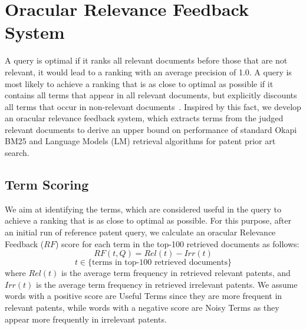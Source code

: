 \section{Oracular Relevance Feedback System}
\label{sec:oraculrquery}
A query is optimal if it ranks all relevant documents before
those that are not relevant, it would lead to a ranking with an average precision of 1.0. A query
is most likely to achieve a ranking that is as close to optimal as possible if it contains all terms that
appear in all relevant documents, but explicitly discounts all terms that occur in non-relevant documents~\citep{manning2008introduction}.
Inspired by this fact, we develop an oracular relevance feedback system, which
extracts terms from the judged relevant documents to derive an upper bound on performance of
standard Okapi BM25 and Language Models (LM) retrieval
algorithms for patent prior art search.
\subsection{Term Scoring}
\label{OracularTermSelection}
We aim at identifying the terms, which are considered useful in the query to achieve a ranking that is as close to optimal as possible. For this purpose, 
after an initial run of reference patent query, we
calculate an oracular Relevance Feedback ($\mathit{RF}$) score for each term in the top-100
retrieved documents as follows:
\begin{equation}
RF(t,Q)=Rel(t)-Irr(t) 
 \label{eq:score}
\end{equation}
\begin{displaymath}t\in \lbrace \mbox{terms in top-100 retrieved documents}\rbrace\end{displaymath}
where $ \mathit{Rel(t)} $ is the average term frequency in retrieved relevant patents, and $ \mathit{Irr(t)} $ is the average term frequency in retrieved irrelevant patents. We assume words with a positive score are Useful Terms since they are more frequent in relevant patents, while words with a negative score are Noisy Terms as they appear more frequently in irrelevant patents. 

